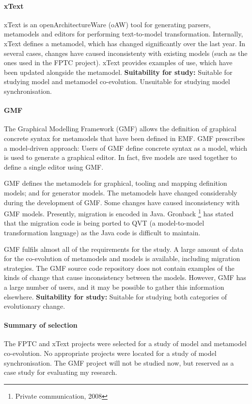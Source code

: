 \paragraph{xText} %
\label{par:xtext}
xText is an openArchitectureWare (oAW) \cite{oaw} tool for generating parsers, metamodels and editors for performing text-to-model transformation. Internally, xText defines a metamodel, which has changed significantly over the last year. In several cases, changes have caused inconsistenty with existing models (such as the ones used in the FPTC project). xText provides examples of use, which have been updated alongside the metamodel. \textbf{Suitability for study:} Suitable for studying model and metamodel co-evolution. Unsuitable for studying model synchronisation.

\paragraph{GMF} %
\label{par:gmf}
The Graphical Modelling Framework (GMF) \cite{gronback06gmf} allows the definition of graphical concrete syntax for metamodels that have been defined in EMF. GMF prescribes a model-driven approach: Users of GMF define concrete syntax as a model, which is used to generate a graphical editor. In fact, five models are used together to define a single editor using GMF.

GMF defines the metamodels for graphical, tooling and mapping definition models; and for generator models. The metamodels have changed considerably during the development of GMF. Some changes have caused inconsistency with GMF models. Presently, migration is encoded in Java. Gronback \footnote{Private communication, 2008} has stated that the migration code is being ported to QVT (a model-to-model transformation language) as the Java code is difficult to maintain.

GMF fulfils almost all of the requirements for the study. A large amount of data for the co-evolution of metamodels and models is available, including migration strategies. The GMF source code repository does not contain examples of the kinds of change that cause inconsistency between the models. However, GMF has a large number of users, and it may be possible to gather this information elsewhere. \textbf{Suitability for study:} Suitable for studying both categories of evolutionary change.

\paragraph{Summary of selection}
The FPTC and xText projects were selected for a study of model and metamodel co-evolution. No appropriate projects were located for a study of model synchronisation. The GMF project will not be studied now, but reserved as a case study for evaluating my research.

